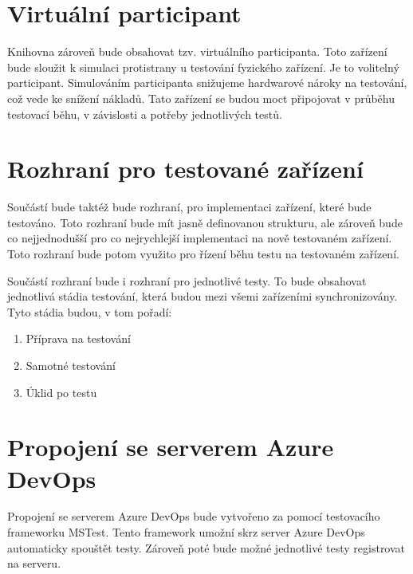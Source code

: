 \section{Virtuální participant}
Knihovna zároveň bude obsahovat tzv. virtuálního participanta. Toto zařízení bude sloužit k simulaci protistrany u testování fyzického zařízení. Je to volitelný participant. Simulováním participanta snižujeme hardwarové nároky na testování, což vede ke snížení nákladů. Tato zařízení se budou moct připojovat v průběhu testovací běhu, v závislosti a potřeby jednotlivých testů.


\section{Rozhraní pro testované zařízení}
Součástí bude taktéž bude rozhraní, pro implementaci zařízení, které bude testováno. Toto rozhraní bude mít jasně definovanou  strukturu, ale zároveň bude co nejjednodušší pro co nejrychlejší implementaci na nově testovaném zařízení. Toto rozhraní bude potom využito pro řízení běhu testu na testovaném zařízení.

Součástí rozhraní bude i rozhraní pro jednotlivé testy. To bude obsahovat jednotlivá stádia testování, která budou mezi všemi zařízeními synchronizovány. Tyto stádia budou, v tom pořadí:
\begin{enumerate}
    \item Příprava na testování
    \item Samotné testování
    \item Úklid po testu
\end{enumerate}


\section{Propojení se serverem Azure DevOps}
Propojení se serverem Azure DevOps bude vytvořeno za pomocí testovacího frameworku MSTest. Tento framework umožní skrz server Azure DevOps automaticky spouštět testy. Zároveň poté bude možné jednotlivé testy registrovat na serveru. 